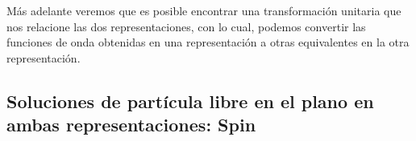 \documentclass[11pt,letterpaper]{article}     %
\begin{document}
Más adelante veremos que es posible encontrar una transformación unitaria que nos relacione las dos representaciones, con lo cual, podemos convertir las funciones de onda obtenidas en una representación a otras equivalentes en la otra representación.





\subsection{Soluciones de partícula libre en el plano en ambas representaciones: Spin}
\end{document}
